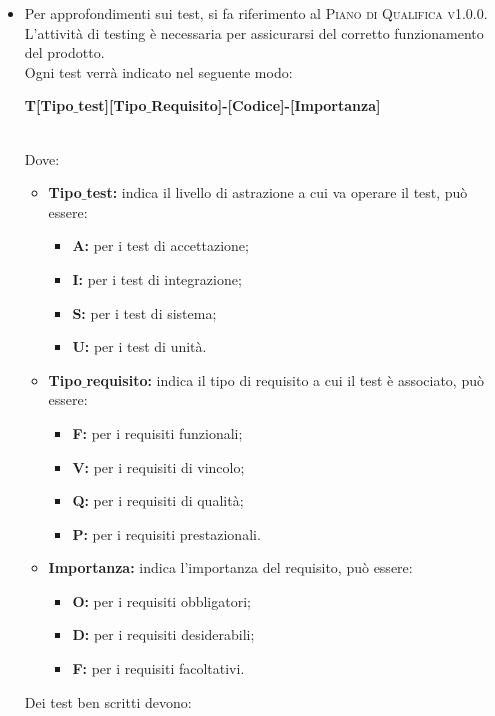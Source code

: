    \begin{itemize}
    	\item[]
    Per approfondimenti sui test, si fa riferimento al \textsc{Piano di Qualifica v1.0.0}.
    L'attività di testing è necessaria per assicurarsi del corretto funzionamento del prodotto.\\Ogni test verrà indicato nel seguente modo:\\
    \begin{center}
    	\textbf{T[Tipo$\_$test][Tipo$\_$Requisito]-[Codice]-[Importanza]}
    \end{center}
    \\Dove:
    \begin{itemize}
    	\item \textbf{Tipo$\_$test:} indica il livello di astrazione a cui va operare il test, può essere:
    	\begin{itemize}
    		\item \textbf{A:} per i test di accettazione;
    		\item \textbf{I:} per i test di integrazione;
    		\item \textbf{S:} per i test di sistema;
    		\item \textbf{U:} per i test di unità.
    	\end{itemize}
    	\item \textbf{Tipo$\_$requisito:} indica il tipo di requisito a cui il test è associato, può essere:
    	\begin{itemize}
    		\item \textbf{F:} per i requisiti funzionali;
    		\item \textbf{V:} per i requisiti di vincolo;
    		\item \textbf{Q:} per i requisiti di qualità;
    		\item \textbf{P:} per i requisiti prestazionali.
    	\end{itemize}
    	\item \textbf{Importanza:} indica l'importanza del requisito, può essere:
    	\begin{itemize}
    		\item \textbf{O:} per i requisiti obbligatori;
    		\item \textbf{D:} per i requisiti desiderabili;
    		\item \textbf{F:} per i requisiti facoltativi.
    	\end{itemize}
    \end{itemize}
    Dei test ben scritti devono:

\end{itemize}
